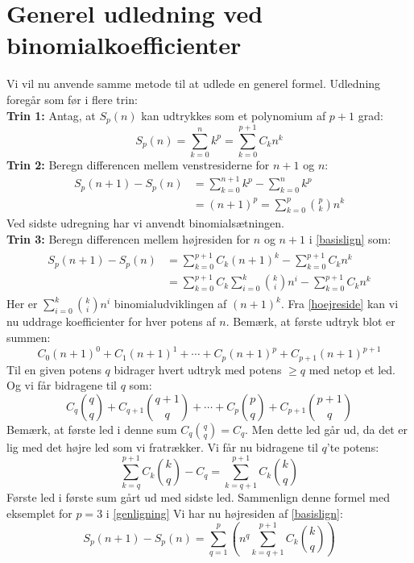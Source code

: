 \section{Generel udledning ved binomialkoefficienter}
Vi vil nu anvende samme metode til at udlede en generel formel. Udledning foregår som før i flere trin:\\
{\bf Trin 1:} Antag, at \(S_p(n)\) kan udtrykkes som et polynomium af \(p+1\) grad:
\begin{equation}
S_p(n)=\sum_{k=0}^nk^p=\sum_{k=0}^{p+1}C_{k}n^k\label{basislign}
\end{equation}
{\bf Trin 2:} Beregn differencen mellem venstresiderne for \(n+1\) og \(n\):
\begin{align*}
S_p(n+1)-S_p(n)&= \sum_{k=0}^{n+1}k^p-\sum_{k=0}^{n}k^p\\
&=(n+1)^p=\sum_{k=0}^{p}\binom{p}{k}n^k
\end{align*}
Ved sidste udregning har vi anvendt binomialsætningen.\\
{\bf Trin 3:} Beregn differencen mellem højresiden for \(n\) og \(n+1\) i \ref{basislign} som:
\begin{align}
\begin{split}
S_p(n+1)-S_p(n)&=\sum_{k=0}^{p+1}C_{k}(n+1)^k-\sum_{k=0}^{p+1}C_{k}n^k\\
&=\sum_{k=0}^{p+1}C_k\sum_{i=0}^{k}\binom{k}{i}n^i-\sum_{k=0}^{p+1}C_{k}n^k
\end{split}
\end{align}\label{hoejreside}
Her er \(\sum_{i=0}^{k}\binom{k}{i}n^i\) binomialudviklingen af \((n+1)^k\).
Fra \ref{hoejreside} kan vi nu uddrage koefficienter for hver potens af \(n\). Bemærk, at første udtryk blot er summen:
\[C_{0}(n+1)^{0}+C_{1}(n+1)^{1}+ \dotsm +C_{p}(n+1)^{p}+C_{p+1}(n+1)^{p+1}\]
Til en given potens \(q\) bidrager hvert udtryk med potens \( \geq q\) med netop et led. Og vi får bidragene til \(q\) som:
\[C_{q}\binom{q}{q}+C_{q+1}\binom{q+1}{q}+ \dotsm +C_{p}\binom{p}{q}+C_{p+1}\binom{p+1}{q}\]
Bemærk, at første led i denne sum \(C_{q}\binom{q}{q}=C_{q}\). Men dette led går ud, da det er lig med det højre led som vi fratrækker. Vi får nu bidragene til \(q\)'te potens:
\[\sum_{k=q}^{p+1}C_{k}\binom{k}{q}-C_{q}=\sum_{k=q+1}^{p+1}C_{k}\binom{k}{q}\]
Første led i første sum gårt ud med sidste led. Sammenlign denne formel med eksemplet for \(p=3\) i \ref{genligning}
Vi har nu højresiden af \ref{basislign}:
\begin{equation}
S_p(n+1)-S_p(n)=\sum_{q=1}^{p}\left(n^q\sum_{k=q+1}^{p+1}C_{k}\binom{k}{q}\right)\label{slutligning}
\end{equation}
